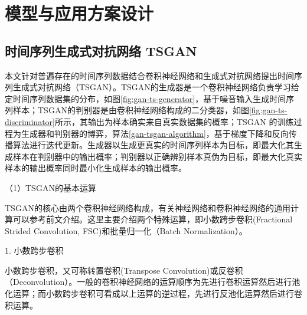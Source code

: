 \section{模型与应用方案设计}

\subsection{时间序列生成式对抗网络 TSGAN}
%
%

本文针对普遍存在的时间序列数据结合卷积神经网络和生成式对抗网络提出时间序列生成式对抗网络（TSGAN）。TSGAN的生成器是一个卷积神经网络负责学习给定时间序列数据集的分布，如图\ref{fig:gan-ts-generator}，基于噪音输入生成时间序列样本；TSGAN的判别器是由卷积神经网络构成的二分类器，如图\ref{fig:gan-ts-discriminator}所示，其输出为样本确实来自真实数据集的概率；TSGAN 的训练过程为生成器和判别器的博弈，算法\ref{gan-tsgan-algorithm}，基于梯度下降和反向传播算法进行迭代更新。生成器以生成更真实的时间序列样本为目标，即最大化其生成样本在判别器中的输出概率；判别器以正确辨别样本真伪为目标，即最大化真实样本的输出概率同时最小化生成样本的输出概率。

（1）TSGAN的基本运算

TSGAN的核心由两个卷积神经网络构成，有关神经网络和卷积神经网络的通用计算可以参考前文介绍。这里主要介绍两个特殊运算，即小数跨步卷积(Fractional Strided Convolution, FSC)\cite{dosovitskiy2015learning}和批量归一化（Batch Normalization）\cite{ioffe2015batch}。

1. 小数跨步卷积

小数跨步卷积，又可称转置卷积(Transpose Convolution)或反卷积（Deconvolution）。一般的卷积神经网络的运算顺序为先进行卷积运算然后进行池化运算；而小数跨步卷积可看成以上运算的逆过程，先进行反池化运算然后进行卷积运算。

